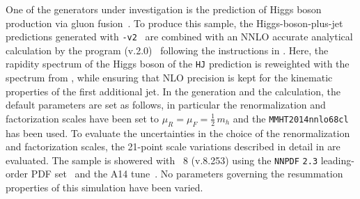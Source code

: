 \subsubsection{\Powheg \NNLOPS}
\label{sec:hjetscomp:tools:nnlops:powheg}

One of the generators under investigation is the \NNLOPS prediction 
of Higgs boson production via gluon fusion~\cite{Hamilton:2013fea}.
To produce this sample, the Higgs-boson-plus-jet \Minlo~\cite{Hamilton:2012np} 
predictions generated with \PowhegBox{}\texttt{-v2}~\cite{Campbell:2012am} 
are combined with an NNLO accurate analytical calculation by the 
program \HNNLO (v.2.0)~\cite{Catani:2007vq,Grazzini:2008tf,Grazzini:2013mca} 
following the instructions in \cite{Hamilton:2013fea}. Here, the rapidity 
spectrum of the Higgs boson of the \Powheg \texttt{HJ} \Minlo prediction 
is reweighted with the spectrum from \HNNLO, while ensuring that NLO 
precision is kept for the kinematic properties of the first additional jet. 
In the generation and the \HNNLO calculation, the default parameters are 
set as follows, in particular the renormalization and factorization scales 
have been set to $\mu_R = \mu_F = \tfrac{1}{2}\,m_h$ and the 
\texttt{MMHT2014nnlo68cl} \cite{Harland-Lang:2014zoa} has been used. 
To evaluate the uncertainties in the choice of the renormalization and 
factorization scales, the 21-point scale variations described in detail 
in \cite{Hamilton:2013fea} are evaluated.
The \NNLOPS sample is showered with \Pythia~8 (v.8.253) \cite{Sjostrand:2014zea} 
using the \texttt{NNPDF} \texttt{2.3} leading-order PDF set~\cite{Ball:2012cx} 
and the A14 tune~\cite{ATL-PHYS-PUB-2014-021}. No parameters governing the 
resummation properties of this simulation have been varied.

